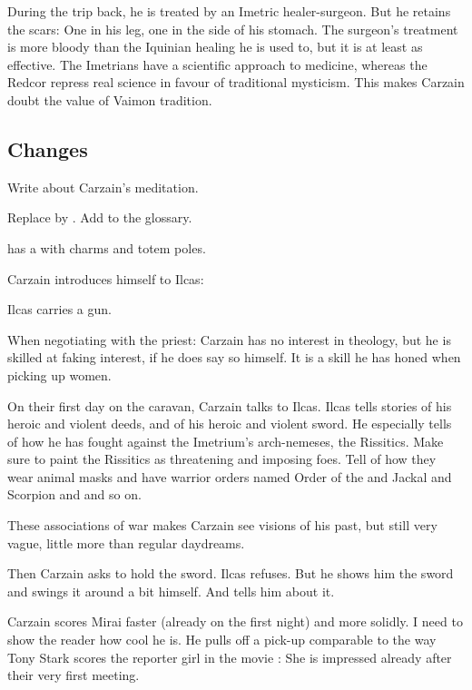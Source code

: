 During the trip back, he is treated by an Imetric healer-surgeon. But he retains the scars: One in his leg, one in the side of his stomach. 
The surgeon's treatment is more bloody than the Iquinian healing he is used to, but it is at least as effective. The Imetrians have a scientific approach to medicine, whereas the Redcor repress real science in favour of traditional mysticism. 
This makes Carzain doubt the value of Vaimon tradition.









\subsection{Changes}
Write about Carzain's meditation. 

Replace  by \quo{\shechinah}.
Add \quo{\shechinah} to the glossary. 

\Bryndwin has a  with charms and totem poles. 

Carzain introduces himself to Ilcas: 

Ilcas carries a gun. 

When negotiating with the priest: 
Carzain has no interest in theology, but he is skilled at faking interest, if he does say so himself. 
It is a skill he has honed when picking up women. 

On their first day on the caravan, Carzain talks to Ilcas. 
Ilcas tells stories of his heroic and violent deeds, and of his heroic and violent sword. 
He especially tells of how he has fought against the Imetrium's arch-nemeses, the Rissitics. 
Make sure to paint the Rissitics as threatening and imposing foes.
Tell of how they wear animal masks and have warrior orders named Order of the  and Jackal and Scorpion and  and so on. 

These associations of war makes Carzain see visions of his past, but still very vague, little more than regular daydreams. 

Then Carzain asks to hold the sword. 
Ilcas refuses. 
But he shows him the sword and swings it around a bit himself. 
And tells him about it. 

Carzain scores Mirai faster (already on the first night) and more solidly. 
I need to show the reader how cool he is. 
He pulls off a pick-up comparable to the way Tony Stark scores the reporter girl in the movie \cite{Movie:IronMan}: 
She is impressed already after their very first meeting. 

